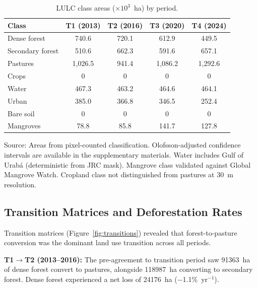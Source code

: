 \documentclass[12pt,a4paper]{article}
\begin{document}
\begin{table}[!ht]
\caption{LULC class areas ($\times 10^3$~ha) by period.\label{tab:areas}}
\begin{threeparttable}
\begin{tabular*}{\textwidth}{@{\extracolsep{\fill}}lcccc@{\extracolsep{\fill}}}
\toprule
Class & T1 (2013) & T2 (2016) & T3 (2020) & T4 (2024) \\
\midrule
Dense forest     & 740.6 & 720.1 & 612.9 & 449.5 \\
Secondary forest & 510.6 & 662.3 & 591.6 & 657.1 \\
Pastures         & 1,026.5 & 941.4 & 1,086.2 & 1,292.6 \\
Crops            & 0 & 0 & 0 & 0 \\
Water            & 467.3 & 463.2 & 464.6 & 464.1 \\
Urban            & 385.0 & 366.8 & 346.5 & 252.4 \\
Bare soil        & 0 & 0 & 0 & 0 \\
Mangroves        & 78.8 & 85.8 & 141.7 & 127.8 \\
\bottomrule
\end{tabular*}
\begin{tablenotes}
\item Source: Areas from pixel-counted classification. Olofsson-adjusted confidence intervals are available in the supplementary materials. Water includes Gulf of Urab\'{a} (deterministic from JRC mask). Mangrove class validated against Global Mangrove Watch. Cropland class not distinguished from pastures at 30~m resolution.
\end{tablenotes}
\end{threeparttable}
\end{table}

\subsection{Transition Matrices and Deforestation Rates}

Transition matrices (Figure~\ref{fig:transitions}) revealed that forest-to-pasture conversion was the dominant land use transition across all periods.

\textbf{T1$\rightarrow$T2 (2013--2016):} The pre-agreement to transition period saw \num{91363}~ha of dense forest convert to pastures, alongside \num{118987}~ha converting to secondary forest. Dense forest experienced a net loss of \num{24176}~ha ($-$1.1\%~yr$^{-1}$).
\end{document}
